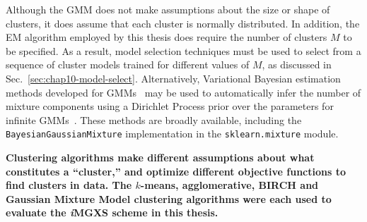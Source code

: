 Although the \ac{GMM} does not make assumptions about the size or shape of clusters, it does assume that each cluster is normally distributed. In addition, the EM algorithm employed by this thesis does require the number of clusters $M$ to be specified. As a result, model selection techniques must be used to select from a sequence of cluster models trained for different values of $M$, as discussed in Sec.~\ref{sec:chap10-model-select}. Alternatively, Variational Bayesian estimation methods developed for \acp{GMM}~\cite{attias2000variational,blei2006variational} may be used to automatically infer the number of mixture components using a Dirichlet Process prior over the parameters for infinite \acp{GMM}~\cite{ferguson1973dirichlet}. These methods are broadly available, including the \texttt{BayesianGaussianMixture} implementation in the \texttt{sklearn.mixture} module.

\begin{emphbox}
\textbf{Clustering algorithms make different assumptions about what constitutes a ``cluster,'' and optimize different objective functions to find clusters in data. The $k$-means, agglomerative, BIRCH and Gaussian Mixture Model clustering algorithms were each used to evaluate the \textit{i}\ac{MGXS} scheme in this thesis.}
\end{emphbox}







